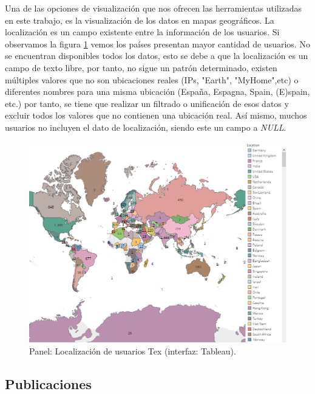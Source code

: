 \documentclass[a4paper, 12pt]{book}
\begin{document}
Una de las opciones de visualización que nos ofrecen las herramientas utilizadas en este trabajo, es la visualización de los datos en mapas geográficos. La localización es un campo existente entre la información de los usuarios. Si observamos la figura \ref{figura:MAP_users_tex} vemos los países presentan mayor cantidad de usuarios. No se encuentran disponibles todos los datos, esto se debe a que la localización es un campo de texto libre, por tanto, no sigue un patrón determinado, existen múltiples valores que no son ubicaciones reales (IPs, "Earth", "MyHome",etc) o diferentes nombres para una misma ubicación (España, Espagna, Spain, (E)spain, etc.) por tanto, se tiene que realizar un filtrado o unificación de esos datos y excluir todos los valores que no contienen una ubicación real. Así mismo, muchos usuarios no incluyen el dato de localización, siendo este un campo a \emph{NULL}. 

\begin{figure}[ht]
    \centering
    \includegraphics[width=\textwidth]{img/tex/Maps_tex.png}
    \caption{Panel: Localización de usuarios Tex (interfaz: Tableau).}
    \label{figura:MAP_users_tex}
\end{figure}

\clearpage


\subsection{Publicaciones}
\end{document}

